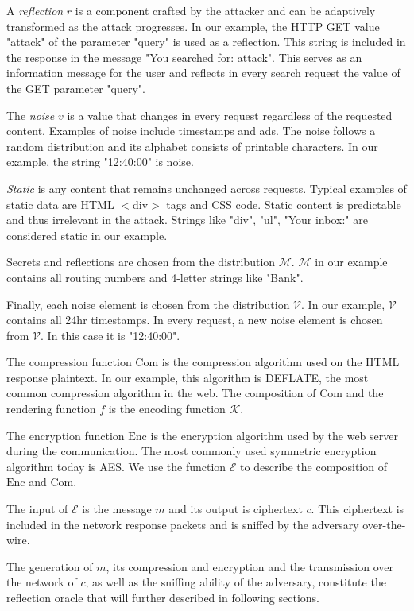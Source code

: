 \documentclass[conference, letterpaper, 10pt]{IEEEtran}
\begin{document}
A \textit{reflection} $r$ is a component crafted by the attacker and can be
adaptively transformed as the attack progresses. In our example, the HTTP GET
value "attack" of the parameter "query" is used as a reflection. This string is
included in the response in the message "You searched for: attack". This serves
as an information message for the user and reflects in every search request the
value of the GET parameter "query".

The \textit{noise} $v$ is a value that changes in every request regardless of
the requested content. Examples of noise include timestamps and ads. The noise
follows a random distribution and its alphabet consists of printable characters.
In our example, the string "12:40:00" is noise.

\textit{Static} is any content that remains unchanged across requests. Typical
examples of static data are HTML $<$div$>$ tags and CSS code. Static content is
predictable and thus irrelevant in the attack. Strings like "div", "ul", "Your
inbox:" are considered static in our example.

Secrets and reflections are chosen from the distribution $\mathcal{M}$.
$\mathcal{M}$ in our example contains all routing numbers and 4-letter strings
like "Bank".

Finally, each noise element is chosen from the distribution $\mathcal{V}$. In
our example, $\mathcal{V}$ contains all 24hr timestamps. In every request, a new
noise element is chosen from $\mathcal{V}$. In this case it is "12:40:00".

The compression function $\textrm{Com}$ is the compression algorithm used on the
HTML response plaintext. In our example, this algorithm is DEFLATE, the most
common compression algorithm in the web. The composition of $\textrm{Com}$ and
the rendering function $f$ is the encoding function $\mathcal{K}$.

The encryption function $\textrm{Enc}$ is the encryption algorithm used by the
web server during the communication. The most commonly used symmetric encryption
algorithm today is AES. We use the function $\mathcal{E}$ to describe the
composition of $\textrm{Enc}$ and $\textrm{Com}$.

The input of $\mathcal{E}$ is the message $m$ and its output is ciphertext $c$.
This ciphertext is included in the network response packets and is sniffed by
the adversary over-the-wire.

The generation of $m$, its compression and encryption and the transmission over
the network of $c$, as well as the sniffing ability of the adversary, constitute
the reflection oracle that will further described in following sections.
\end{document}
